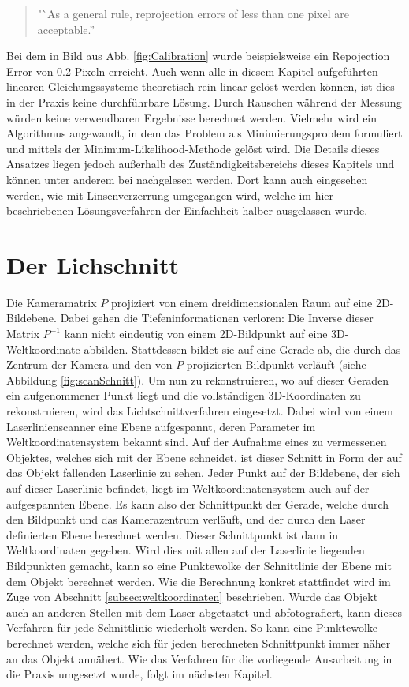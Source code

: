 \begin{quotation}
"`As a general rule, reprojection errors of less than one pixel are acceptable.''
\end{quotation}
Bei dem in Bild aus Abb. \ref{fig:Calibration} wurde beispielsweise ein Repojection Error von 0.2 Pixeln erreicht.\newline
Auch wenn alle in diesem Kapitel aufgeführten linearen Gleichungssysteme theoretisch rein linear gelöst werden können, ist dies in der Praxis keine durchführbare Lösung. Durch Rauschen während der Messung würden keine verwendbaren Ergebnisse berechnet werden. Vielmehr wird ein Algorithmus angewandt, in dem das Problem als Minimierungsproblem formuliert und mittels der Minimum-Likelihood-Methode gelöst wird. Die Details dieses Ansatzes liegen jedoch außerhalb des Zuständigkeitsbereichs dieses Kapitels und können unter anderem bei \cite{Zhang:00} nachgelesen werden. Dort kann auch eingesehen werden, wie mit Linsenverzerrung umgegangen wird, welche im hier beschriebenen Lösungsverfahren der Einfachheit halber ausgelassen wurde.

\section{Der Lichschnitt}
Die Kameramatrix \(P\) projiziert von einem dreidimensionalen Raum auf eine 2D-Bildebene. Dabei gehen die Tiefeninformationen verloren: Die Inverse dieser Matrix \(P^{-1}\) kann nicht eindeutig von einem 2D-Bildpunkt auf eine 3D-Weltkoordinate abbilden. Stattdessen bildet sie auf eine Gerade ab, die durch das Zentrum der Kamera und den von \(P\) projizierten Bildpunkt verläuft (siehe Abbildung \ref{fig:scanSchnitt}). Um nun zu rekonstruieren, wo auf dieser Geraden ein aufgenommener Punkt liegt und die vollständigen 3D-Koordinaten zu rekonstruieren, wird das Lichtschnittverfahren eingesetzt. Dabei wird von einem Laserlinienscanner eine Ebene aufgespannt, deren Parameter im Weltkoordinatensystem bekannt sind. Auf der Aufnahme eines zu vermessenen Objektes, welches sich mit der Ebene schneidet, ist dieser Schnitt in Form der auf das Objekt fallenden Laserlinie zu sehen. Jeder Punkt auf der Bildebene, der sich auf dieser Laserlinie befindet, liegt im Weltkoordinatensystem auch auf der aufgespannten Ebene. Es kann also der Schnittpunkt der Gerade, welche durch den Bildpunkt und das Kamerazentrum verläuft, und der durch den Laser definierten Ebene berechnet werden. Dieser Schnittpunkt ist dann in Weltkoordinaten gegeben. Wird dies mit allen auf der Laserlinie liegenden Bildpunkten gemacht, kann so eine Punktewolke der Schnittlinie der Ebene mit dem Objekt berechnet werden. Wie die Berechnung konkret stattfindet wird im Zuge von Abschnitt \ref{subsec:weltkoordinaten} beschrieben.\newline
Wurde das Objekt auch an anderen Stellen mit dem Laser abgetastet und abfotografiert, kann dieses Verfahren für jede Schnittlinie wiederholt werden. So kann eine Punktewolke berechnet werden, welche sich für jeden berechneten Schnittpunkt immer näher an das Objekt annähert. Wie das Verfahren für die vorliegende Ausarbeitung in die Praxis umgesetzt wurde, folgt im nächsten Kapitel.

